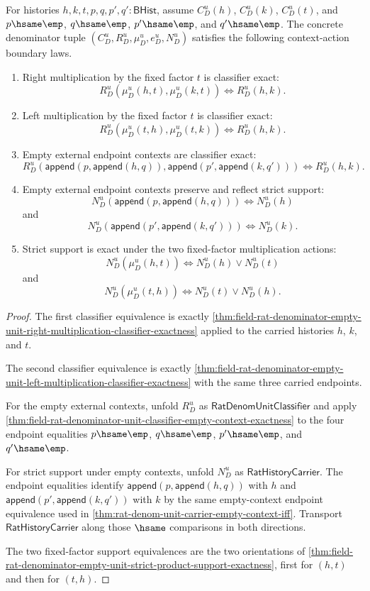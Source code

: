 \begin{theorem}
\label{thm:field-rat-denominator-empty-unit-context-action-support-exactness}
For histories $h,k,t,p,q,p',q':\mathsf{BHist}$, assume
$C_D^u(h)$, $C_D^u(k)$, $C_D^u(t)$, and
$p\hsame\emp$, $q\hsame\emp$, $p'\hsame\emp$, and
$q'\hsame\emp$. The concrete denominator tuple
$(C_D^u,R_D^u,\mu_D^u,e_D^u,N_D^u)$ satisfies the following context-action
boundary laws.
\begin{enumerate}
\item Right multiplication by the fixed factor $t$ is classifier exact:
$$
R_D^u(\mu_D^u(h,t),\mu_D^u(k,t)) \Longleftrightarrow R_D^u(h,k).
$$
\item Left multiplication by the fixed factor $t$ is classifier exact:
$$
R_D^u(\mu_D^u(t,h),\mu_D^u(t,k)) \Longleftrightarrow R_D^u(h,k).
$$
\item Empty external endpoint contexts are classifier exact:
$$
R_D^u(\mathsf{append}(p,\mathsf{append}(h,q)),
\mathsf{append}(p',\mathsf{append}(k,q')))
\Longleftrightarrow
R_D^u(h,k).
$$
\item Empty external endpoint contexts preserve and reflect strict support:
$$
N_D^u(\mathsf{append}(p,\mathsf{append}(h,q))) \Longleftrightarrow N_D^u(h)
$$
and
$$
N_D^u(\mathsf{append}(p',\mathsf{append}(k,q'))) \Longleftrightarrow N_D^u(k).
$$
\item Strict support is exact under the two fixed-factor multiplication
actions:
$$
N_D^u(\mu_D^u(h,t)) \Longleftrightarrow N_D^u(h)\lor N_D^u(t)
$$
and
$$
N_D^u(\mu_D^u(t,h)) \Longleftrightarrow N_D^u(t)\lor N_D^u(h).
$$
\end{enumerate}
\end{theorem}
\begin{proof}
The first classifier equivalence is exactly
\autoref{thm:field-rat-denominator-empty-unit-right-multiplication-classifier-exactness}
applied to the carried histories $h$, $k$, and $t$.

The second classifier equivalence is exactly
\autoref{thm:field-rat-denominator-empty-unit-left-multiplication-classifier-exactness}
with the same three carried endpoints.

For the empty external contexts, unfold $R_D^u$ as
$\mathsf{RatDenomUnitClassifier}$ and apply
\autoref{thm:field-rat-denominator-unit-classifier-empty-context-exactness}
to the four endpoint equalities $p\hsame\emp$, $q\hsame\emp$,
$p'\hsame\emp$, and $q'\hsame\emp$.

For strict support under empty contexts, unfold $N_D^u$ as
$\mathsf{RatHistoryCarrier}$. The endpoint equalities identify
$\mathsf{append}(p,\mathsf{append}(h,q))$ with $h$ and
$\mathsf{append}(p',\mathsf{append}(k,q'))$ with $k$ by the same empty-context
endpoint equivalence used in
\autoref{thm:rat-denom-unit-carrier-empty-context-iff}. Transport
$\mathsf{RatHistoryCarrier}$ along those $\hsame$ comparisons in both
directions.

The two fixed-factor support equivalences are the two orientations of
\autoref{thm:field-rat-denominator-empty-unit-strict-product-support-exactness},
first for $(h,t)$ and then for $(t,h)$.
\end{proof}

